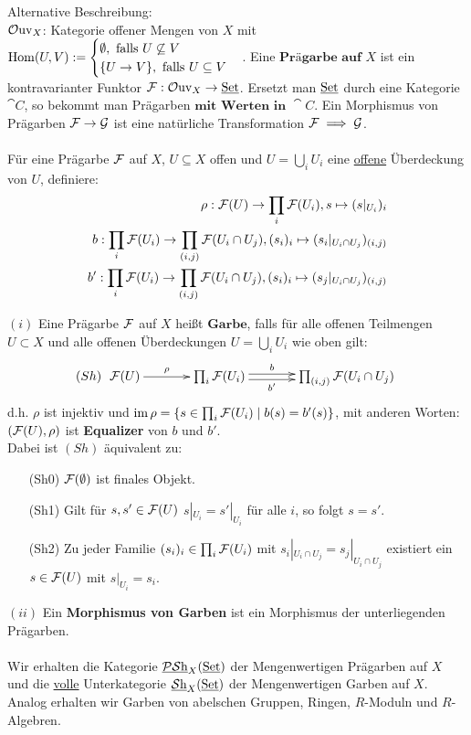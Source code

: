 Alternative Beschreibung:\\
$\operatorname{\mathcal{O}uv}_{X}$: Kategorie offener Mengen von $X$ mit $\operatorname{\mathrm{Hom}}(U, V) := \begin{cases} \emptyset, \text{ falls } U \not\subseteq V \\ \{ U \to V\}, \text{ falls } U \subseteq V \end{cases}$.
Eine $\textbf{Prägarbe auf }X$ ist ein kontravarianter Funktor $\mathcal{F} : \operatorname{\mathcal{O}uv}_{X} \to \operatorname{\underline{Set}}$. Ersetzt man $\operatorname{\underline{Set}}$ durch eine Kategorie $\cat{C}$, so bekommt man Prägarben $\textbf{mit Werten in } \cat{C}$.
Ein Morphismus von Prägarben $\mathcal{F} \to \mathcal{G}$ ist eine natürliche Transformation $\mathcal{F} \implies \mathcal{G}$.\\
\\
Für eine Prägarbe $\mathcal{F}$ auf $X$, $U \subseteq X$ offen und $U = \bigcup_{i} U_{i}$ eine \underline{offene} Überdeckung von $U$, definiere:
\begin{align}
\rho : \mathcal{F}(U) \to \prod_{i}\mathcal{F}(U_{i}), s \mapsto (s|_{U_{i}})_{i}\\
b : \prod_{i} \mathcal{F}(U_{i}) \to \prod_{(i, j)} \mathcal{F}(U_{i} \cap U_{j}), (s_{i})_{i} \mapsto (s_{i}|_{U_{i} \cap U_{j}})_{(i,j)}\\
b' : \prod_{i} \mathcal{F}(U_{i}) \to \prod_{(i, j)} \mathcal{F}(U_{i} \cap U_{j}), (s_{i})_{i} \mapsto (s_{j}|_{U_{i} \cap U_{j}})_{(i,j)}
\end{align}

\begin{defn}
\label{def:garbe}
$(i)$ Eine Prägarbe $\mathcal{F}$ auf $X$ heißt $\textbf{Garbe}$, falls für alle offenen Teilmengen $U \subset X$ und alle offenen Überdeckungen $U = \bigcup_{i} U_{i}$ wie oben gilt:\\
\[
(Sh)\ \xymatrixcolsep{3pc}\xymatrix{\sheaf{F}(U)\ar^-\rho@{->}[r] & \prod_{i}\sheaf{F}(U_{i}) \ar^-b@<+.5ex>[r] \ar_-{b'}@<-.5ex>[r] & \prod_{(i, j)}\sheaf{F}(U_{i} \cap U_{j})}
\]d.h. $\rho$ ist injektiv und $\operatorname{\mathrm{im}}\rho = \{ s \in \prod_{i} \mathcal{F}(U_{i}) \mid b(s) = b'(s)\}$, mit anderen Worten: $(\mathcal{F}(U), \rho)$ ist \textbf{Equalizer} von $b$ und $b'$.\\
Dabei ist $(Sh)$ äquivalent zu:
\begin{enumerate}
	\item[(Sh0)]   $\mathcal{F}(\emptyset)$ ist finales Objekt.
	\item[(Sh1)] Gilt für $s,s' \in \mathcal{F}(U)$  $s|_{U_{i}} = s'|_{U_{i}}$ für alle $i$, so folgt $s = s'$.
	\item[(Sh2)] Zu jeder Familie $(s_{i})_{i} \in \prod_{i}\mathcal{F}(U_{i})$ mit $s_{i}|_{U_{i} \cap U_{j}} = s_{j}|_{U_{i} \cap U_{j}}$ existiert ein $s \in \mathcal{F}(U)$ mit $s|_{U_{i}} = s_{i}$.
\end{enumerate}
$(ii)$ Ein \textbf{Morphismus von Garben} ist ein Morphismus der unterliegenden Prägarben.\\
\\
Wir erhalten die Kategorie $\operatorname{\underline{\mathcal{PS}h}}_{X}(\operatorname{\underline{Set}})$ der Mengenwertigen Prägarben auf $X$ und die \underline{volle} Unterkategorie $\operatorname{\underline{\mathcal{S}h}}_{X}(\operatorname{\underline{Set}})$ der Mengenwertigen Garben auf $X$.
Analog erhalten wir Garben von abelschen Gruppen, Ringen, $R$-Moduln und $R$-Algebren.
\end{defn}

